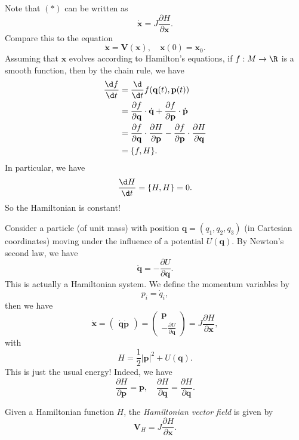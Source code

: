 \documentclass[a4paper]{article}
\begin{document}
Note that $(*)$ can be written as
\[
  \dot{\mathbf{x}} = J \frac{\partial H}{\partial \mathbf{x}}.
\]
Compare this to the equation
\[
  \dot{\mathbf{x}} = \mathbf{V}(\mathbf{x}), \quad \mathbf{x}(0) = \mathbf{x}_0.
\]
Assuming that $\mathbf{x}$ evolves according to Hamilton's equations, if $f: M \to \R$ is a smooth function, then by the chain rule, we have
\begin{align*}
  \frac{\d f}{\d t} &= \frac{\d}{\d t} f(\mathbf{q}(t), \mathbf{p}(t))\\
  &= \frac{\partial f}{\partial \mathbf{q}} \cdot \dot{\mathbf{q}} + \frac{\partial f}{\partial \mathbf{p}} \cdot \dot{\mathbf{p}}\\
  &= \frac{\partial f}{\partial \mathbf{q}} \cdot \frac{\partial H}{\partial \mathbf{p}} - \frac{\partial f}{\partial \mathbf{p}} \cdot \frac{\partial H}{\partial \mathbf{q}} \\
  &= \{f, H\}.
\end{align*}
In particular, we have
\[
  \frac{\d H}{\d t} = \{H, H\} = 0.
\]
So the Hamiltonian is constant!
\begin{eg}
  Consider a particle (of unit mass) with position $\mathbf{q} = (q_1, q_2, q_3)$ (in Cartesian coordinates) moving under the influence of a potential $U(\mathbf{q})$. By Newton's second law, we have
  \[
    \ddot{\mathbf{q}} = -\frac{\partial U}{\partial \mathbf{q}}.
  \]
  This is actually a Hamiltonian system. We define the momentum variables by
  \[
    p_i = \dot{q}_i,
  \]
  then we have
  \[
    \dot{\mathbf{x}} =
    \begin{pmatrix}
      \dot{\mathbf{q}}
      \dot{\mathbf{p}}
    \end{pmatrix}
    =
    \begin{pmatrix}
      \mathbf{p}\\
      -\frac{\partial U}{\partial \mathbf{q}}
    \end{pmatrix}
    = J \frac{\partial H}{\partial \mathbf{x}},
  \]
  with
  \[
    H = \frac{1}{2} |\mathbf{p}|^2 + U(\mathbf{q}).
  \]
  This is just the usual energy! Indeed, we have
  \[
    \frac{\partial H}{\partial \mathbf{p}} = \mathbf{p},\quad \frac{\partial H}{\partial \mathbf{q}} = \frac{\partial H}{\partial \mathbf{q}}.
  \]
\end{eg}

\begin{defi}
  Given a Hamiltonian function $H$, the \emph{Hamiltonian vector field} is given by 
  \[
    \mathbf{V}_H = J \frac{\partial H}{\partial \mathbf{x}}.
  \]
\end{defi}
\end{document}
